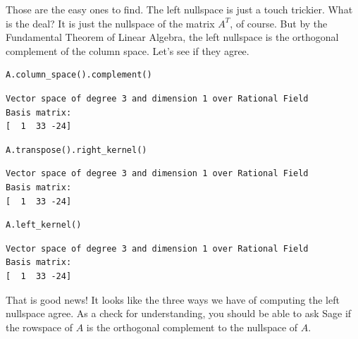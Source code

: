 \documentclass[10pt,]{book}
\theoremstyle{plain}
\theoremstyle{definition}
\numberwithin{equation}{section}
\begin{document}
      Those are the easy ones to find. The left nullspace is just a touch trickier.
      What is the deal? It is just the nullspace of the matrix \(A^T\), of course.
      But by the Fundamental Theorem of Linear Algebra, the left nullspace is the
      orthogonal complement of the column space. Let's see if they agree.
\begin{lstlisting}[style=sageinput]
A.column_space().complement()
\end{lstlisting}
\begin{lstlisting}[style=sageoutput]
Vector space of degree 3 and dimension 1 over Rational Field
Basis matrix:
[  1  33 -24]
\end{lstlisting}
\begin{lstlisting}[style=sageinput]
A.transpose().right_kernel()
\end{lstlisting}
\begin{lstlisting}[style=sageoutput]
Vector space of degree 3 and dimension 1 over Rational Field
Basis matrix:
[  1  33 -24]
\end{lstlisting}
\begin{lstlisting}[style=sageinput]
A.left_kernel()
\end{lstlisting}
\begin{lstlisting}[style=sageoutput]
Vector space of degree 3 and dimension 1 over Rational Field
Basis matrix:
[  1  33 -24]
\end{lstlisting}
\par

      That is good news! It looks like the three ways we have of computing the
      left nullspace agree. As a check for understanding, you should be able to
      ask Sage if the rowspace of \(A\) is the orthogonal complement to the
      nullspace of \(A\).
\typeout{************************************************}
\typeout{************************************************}
\end{document}
